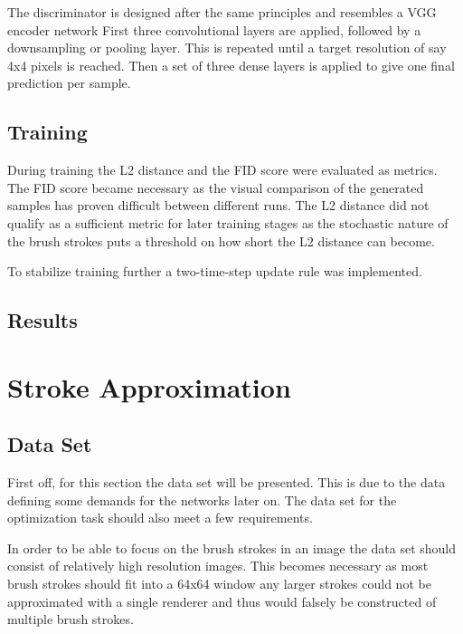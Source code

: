 The discriminator is designed after the same principles and resembles a VGG encoder
network
First three convolutional layers are applied, followed by a downsampling or pooling layer.
This is repeated until a target resolution of say 4x4 pixels is reached.
Then a set of three dense layers is applied to give one final prediction per sample.

\subsection{Training}
During training the L2 distance and the FID score were evaluated as metrics.
The FID score became necessary as the visual comparison of the generated samples
has proven difficult between different runs.
The L2 distance did not qualify as a sufficient metric for later training stages
as the stochastic nature of the brush strokes puts a threshold on how short the L2
distance can become.

To stabilize training further a two-time-step update rule was implemented.

\subsection{Results}


\section{Stroke Approximation}

\subsection{Data Set}
First off, for this section the data set will be presented.
This is due to the data defining some demands for the networks later on.
The data set for the optimization task should also meet a few requirements.

In order to be able to focus on the brush strokes in an image the data set should
consist of relatively high resolution images.
This becomes necessary as most brush strokes should fit into a 64x64 window any larger
strokes could not be approximated with a single renderer and thus would falsely be constructed
of multiple brush strokes.

